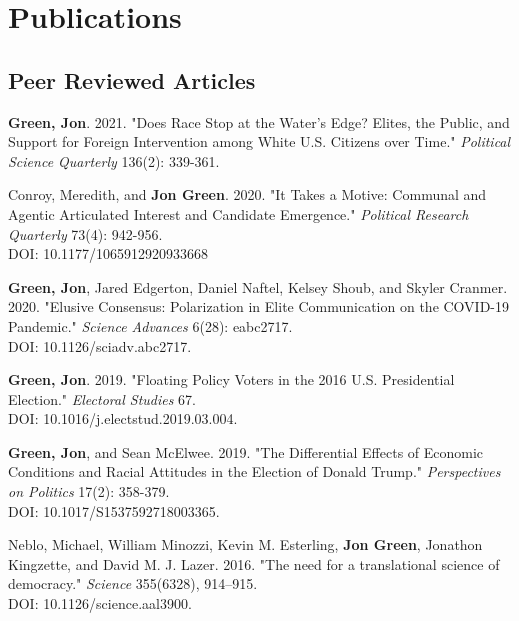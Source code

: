 \documentclass[letterpaper]{article}
\renewenvironment{itemize}{
  \begin{list}{}{
    \setlength{\leftmargin}{1.5em}
  }
}{
  \end{list}
}
\begin{document}
\section*{Publications}

\subsection*{Peer Reviewed Articles}

\begin{itemize}

\item \textbf{Green, Jon}. 2021. "Does Race Stop at the Water's Edge? Elites, the Public, and Support for Foreign Intervention among White U.S. Citizens over Time." \textit{Political Science Quarterly} 136(2): 339-361.

\item Conroy, Meredith, and \textbf{Jon Green}. 2020. "It Takes a Motive: Communal and Agentic Articulated Interest and Candidate Emergence."  \textit{Political Research Quarterly} 73(4): 942-956. \\
DOI: 10.1177/1065912920933668

\item \textbf{Green, Jon}, Jared Edgerton, Daniel Naftel, Kelsey Shoub, and Skyler Cranmer. 2020. "Elusive Consensus: Polarization in Elite Communication on the COVID-19 Pandemic." \textit{Science Advances} 6(28): eabc2717. \\
DOI: 10.1126/sciadv.abc2717.

\item \textbf{Green, Jon}. 2019. "Floating Policy Voters in the 2016 U.S. Presidential Election." \textit{Electoral Studies} 67. \\
DOI: 10.1016/j.electstud.2019.03.004.

\item \textbf{Green, Jon}, and Sean McElwee. 2019. "The Differential Effects of Economic Conditions and Racial Attitudes in the Election of Donald Trump." \textit{Perspectives on Politics} 17(2): 358-379. \\
DOI: 10.1017/S1537592718003365.

\item Neblo, Michael, William Minozzi, Kevin M. Esterling, \textbf{Jon Green}, Jonathon Kingzette, and David M. J. Lazer. 2016. "The need for a translational science of democracy." \textit{Science} 355(6328), 914--915.\\
DOI: 10.1126/science.aal3900.
\end{itemize}
\end{document}
